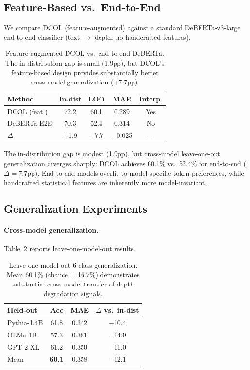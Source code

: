 \documentclass[11pt,a4paper]{article}
\newcommand{\ours}{DCOL}
\begin{document}
\subsection{Feature-Based vs.\ End-to-End}
\label{sec:e2e}

We compare \ours{} (feature-augmented) against a standard DeBERTa-v3-large end-to-end classifier (text $\to$ depth, no handcrafted features).

\begin{table}[t]
\centering
\small
\begin{tabular}{lcccc}
\toprule
\textbf{Method} & \textbf{In-dist} & \textbf{LOO} & \textbf{MAE} & \textbf{Interp.} \\
\midrule
\ours{} (feat.) & 72.2 & 60.1 & 0.289 & Yes \\
DeBERTa E2E & 70.3 & 52.4 & 0.314 & No \\
$\Delta$ & +1.9 & +7.7 & $-$0.025 & --- \\
\bottomrule
\end{tabular}
\caption{Feature-augmented \ours{} vs.\ end-to-end DeBERTa. The in-distribution gap is small (1.9pp), but \ours{}'s feature-based design provides substantially better cross-model generalization (+7.7pp).}
\label{tab:e2e}
\end{table}

The in-distribution gap is modest (1.9pp), but cross-model leave-one-out generalization diverges sharply: \ours{} achieves 60.1\% vs.\ 52.4\% for end-to-end ($\Delta = 7.7$pp). End-to-end models overfit to model-specific token preferences, while handcrafted statistical features are inherently more model-invariant.

\subsection{Generalization Experiments}
\label{sec:generalization}

\paragraph{Cross-model generalization.}
Table~\ref{tab:loo_model} reports leave-one-model-out results.

\begin{table}[t]
\centering
\small
\begin{tabular}{lccc}
\toprule
\textbf{Held-out} & \textbf{Acc} & \textbf{MAE} & \textbf{$\Delta$ vs.\ in-dist} \\
\midrule
Pythia-1.4B & 61.8 & 0.342 & $-$10.4 \\
OLMo-1B    & 57.3 & 0.381 & $-$14.9 \\
GPT-2 XL   & 61.2 & 0.350 & $-$11.0 \\
\midrule
Mean        & \textbf{60.1} & 0.358 & $-$12.1 \\
\bottomrule
\end{tabular}
\caption{Leave-one-model-out 6-class generalization. Mean 60.1\% (chance = 16.7\%) demonstrates substantial cross-model transfer of depth degradation signals.}
\label{tab:loo_model}
\end{table}
\end{document}
